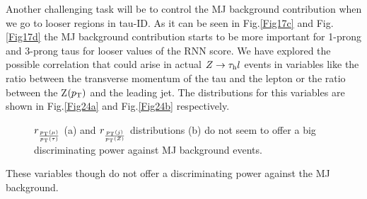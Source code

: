 Another challenging task will be to control the MJ background contribution when we go to looser regions in tau-ID. As it can be seen in Fig.\ref{Fig17c} and Fig.\ref{Fig17d} the MJ background contribution starts to be more important for 1-prong and 3-prong taus for looser values of the RNN score. We have explored the possible correlation that could arise in actual $Z\to\tau_\text{h} l$ events in variables like the ratio between the transverse momentum of the tau and the lepton or the ratio between the Z$(p_\text{T})$ and the leading jet. The distributions for this variables are shown in Fig.\ref{Fig24a} and Fig.\ref{Fig24b} respectively.
\begin{figure}[H]
	\centering
	\hfill
	\caption{$r_{\frac{p_\text{T}(\mu)}{p_\text{T}(\tau)}}$ (a) and $r_{\frac{p_\text{T}(j)}{p_\text{T}(Z)}}$ distributions (b) do not seem to offer a big discriminating power against MJ background events. }
	\label{Fig24}
\end{figure}
These variables though do not offer a discriminating power against the MJ background. 